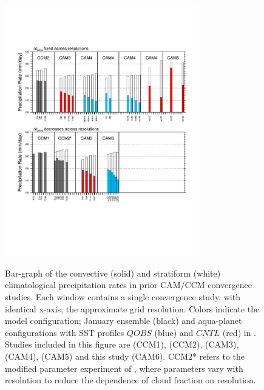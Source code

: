\documentclass[times]{qjrms4}
\begin{document}
\begin{figure}[t]
\begin{center}
\noindent\includegraphics[width=20pc,angle=0]{figs/cam-history.pdf}\\
\end{center}
\caption{Bar-graph of the convective (solid) and stratiform (white) climatological precipitation rates in prior CAM/CCM convergence studies. Each window contains a single convergence study, with identical x-axis; the approximate grid resolution. Colors indicate the model configuration; January ensemble (black) and aqua-planet configurations with SST profiles $QOBS$ (blue) and $CNTL$ (red) in \cite{NH2000ASL}. Studies included in this figure are \cite{KW1991JGR} (CCM1), \cite{WETAL1995CD} (CCM2), \cite{W2008TELLUS} (CAM3), \cite{RETAL2013JCLIM,ZetAl2014JCb,HR2017JCLIM} (CAM4), \cite{ZetAl2014JCb} (CAM5) and this study (CAM6). CCM2* refers to the modified parameter experiment of \cite{WETAL1995CD}, where parameters vary with resolution to reduce the dependence of cloud fraction on resolution.}
\label{fig:cam-history}
\end{figure}
\end{document}
